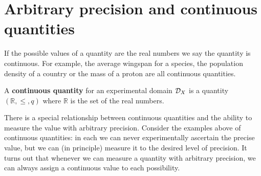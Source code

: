\documentclass[11pt,letterpaper,fleqn]{memoir} %
\begin{document}
\section{Arbitrary precision and continuous quantities}

If the possible values of a quantity are the real numbers we say the quantity is continuous. For example, the average wingspan for a species, the population density of a country or the mass of a proton are all continuous quantities.

\begin{mathSection}
	\begin{defn}
		A \textbf{continuous quantity} for an experimental domain $\mathcal{D}_X$ is a quantity $(\mathbb{R}, \leq, q)$ where $\mathbb{R}$ is the set of the real numbers.
	\end{defn}
\end{mathSection}

There is a special relationship between continuous quantities and the ability to measure the value with arbitrary precision. Consider the examples above of continuous quantities: in each we can never experimentally ascertain the precise value, but we can (in principle) measure it to the desired level of precision. It turns out that whenever we can measure a quantity with arbitrary precision, we can always assign a continuous value to each possibility.
\end{document}
